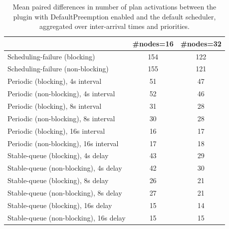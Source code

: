 \begin{table}[t]
\tiny
\setlength{\tabcolsep}{1.2pt}
\renewcommand{\arraystretch}{1.12}
\centering
\caption{Mean paired differences in number of plan activations between the plugin with DefaultPreemption enabled and the default scheduler, aggregated over inter-arrival times and priorities.}
\label{tab:plan_activations-defpreempt1-std0-agg-arrival-prio}
\begin{tabular}{l c c}
\toprule
 & \#nodes=16 & \#nodes=32 \\
\midrule
Scheduling-failure (blocking) & 154 & 122 \\
Scheduling-failure (non-blocking) & 155 & 121 \\
Periodic (blocking), 4s interval & 51 & 47 \\
Periodic (non-blocking), 4s interval & 52 & 46 \\
Periodic (blocking), 8s interval & 31 & 28 \\
Periodic (non-blocking), 8s interval & 30 & 28 \\
Periodic (blocking), 16s interval & 16 & 17 \\
Periodic (non-blocking), 16s interval & 17 & 18 \\
Stable-queue (blocking), 4s delay & 43 & 29 \\
Stable-queue (non-blocking), 4s delay & 42 & 30 \\
Stable-queue (blocking), 8s delay & 26 & 21 \\
Stable-queue (non-blocking), 8s delay & 27 & 21 \\
Stable-queue (blocking), 16s delay & 15 & 14 \\
Stable-queue (non-blocking), 16s delay & 15 & 15 \\
\bottomrule
\end{tabular}
\end{table}
